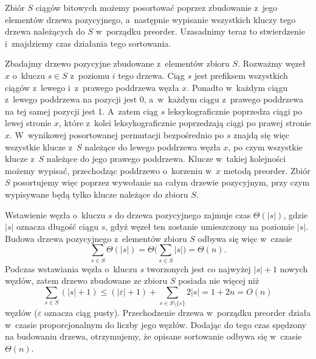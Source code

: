
\noindent Zbiór $S$ ciągów bitowych możemy posortować poprzez zbudowanie z~jego elementów drzewa pozycyjnego, a~następnie wypisanie wszystkich kluczy tego drzewa należących do $S$ w~porządku preorder.
Uzasadnimy teraz to stwierdzenie i~znajdziemy czas działania tego sortowania.

Zbadajmy drzewo pozycyjne zbudowane z~elementów zbioru $S$.
Rozważmy węzeł $x$ o~kluczu $s\in S$ z~poziomu $i$ tego drzewa.
Ciąg $s$ jest  prefiksem wszystkich ciągów z~lewego i~z~prawego poddrzewa węzła $x$.
Ponadto w~każdym ciągu z~lewego poddrzewa na  pozycji jest 0, a~w~każdym ciągu z~prawego poddrzewa na tej samej pozycji jest 1.
A~zatem ciąg $s$ leksykograficznie poprzedza ciągi po lewej stronie $x$, które z~kolei leksykograficznie poprzedzają ciągi po prawej stronie $x$.
W~wynikowej posortowanej permutacji bezpośrednio po $s$ znajdą się więc wszystkie klucze z~$S$ należące do lewego poddrzewa węzła $x$, po czym wszystkie klucze z~$S$ należące do jego prawego poddrzewa.
Klucze w~takiej kolejności możemy wypisać, przechodząc poddrzewo o~korzeniu w~$x$ metodą preorder.
Zbiór $S$ posortujemy więc poprzez wywołanie  na całym drzewie pozycyjnym, przy czym wypisywane będą tylko klucze należące do zbioru $S$.

Wstawienie węzła o~kluczu $s$ do drzewa pozycyjnego zajmuje czas $\Theta(|s|)$, gdzie $|s|$ oznacza długość ciągu $s$, gdyż węzeł ten zostanie umieszczony na poziomie $|s|$.
Budowa drzewa pozycyjnego z~elementów zbioru $S$ odbywa się więc w~czasie
\[
	\sum_{s\in S}\Theta(|s|) = \Theta\biggl(\sum_{s\in S}|s|\biggr) = \Theta(n).
\]
Podczas wstawiania węzła o~kluczu $s$ tworzonych jest co najwyżej $|s|+1$ nowych węzłów, zatem drzewo zbudowane ze zbioru $S$ posiada nie więcej niż
\[
	\sum_{s\in S}(|s|+1) \le (|\varepsilon|+1)+\sum_{s\in S\setminus\{\varepsilon\}}2|s| = 1+2n = O(n)
\]
węzłów ($\varepsilon$ oznacza ciąg pusty).
Przechodzenie drzewa w~porządku preorder działa w~czasie proporcjonalnym do liczby jego węzłów.
Dodając do tego czas spędzony na budowaniu drzewa, otrzymujemy, że opisane sortowanie odbywa się w~czasie $\Theta(n)$.


\subproblem %
\subproblem %
\subproblem %
\subproblem %
\subproblem %
\subproblem %


\subproblem %
\subproblem %
\subproblem %

\subproblem %

\endinput
